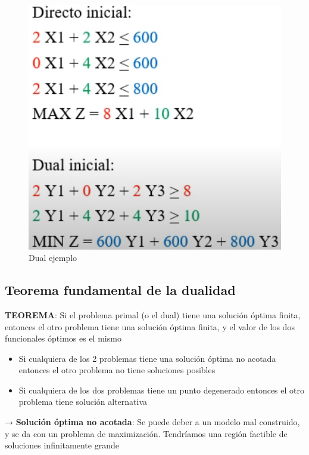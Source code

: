\documentclass[titlepage,a4paper]{article}
\begin{document}
\begin{figure}[H]
    \centering
    \includegraphics[scale=0.5]{dual_ejemplo.png}
    \caption{Dual ejemplo}
\end{figure}


\vspace{0.5cm}

\subsection{Teorema fundamental de la dualidad}
 

\textbf{TEOREMA}: Si el problema primal (o el dual) tiene una solución óptima finita, entonces el otro problema tiene una solución óptima finita, y el valor de los dos funcionales óptimos es el mismo

\begin{itemize}
    \item Si cualquiera de los 2 problemas tiene una solución óptima no acotada entonces el otro problema no tiene soluciones posibles
    \item Si cualquiera de los dos problemas tiene un punto degenerado entonces el otro problema tiene solución alternativa
\end{itemize}

→ \textbf{Solución óptima no acotada}: Se puede deber a un modelo mal construido, y se da con un problema de maximización. Tendríamos una región factible de soluciones infinitamente grande
\end{document}
